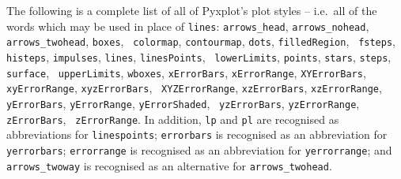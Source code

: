 The following is a complete list of all of Pyxplot's plot styles -- i.e.\ all
of the words which may be used in place of {\tt lines}: {\tt arrows\_\-head},
{\tt arrows\_\-no\-head}, {\tt arrows\_\-two\-head}, {\tt boxes}, {\tt
color\-map}, {\tt contour\-map}, {\tt dots}, {\tt filled\-Region}, {\tt
fsteps}, {\tt histeps}, {\tt impulses}, {\tt lines}, {\tt lines\-Points}, {\tt
lower\-Limits}, {\tt points}, {\tt stars}, {\tt steps}, {\tt surface}, {\tt
upper\-Limits}, {\tt wbox\-es}, {\tt x\-Error\-Bars}, {\tt x\-Error\-Range},
{\tt XY\-Error\-Bars}, {\tt xy\-Error\-Range}, {\tt xyz\-Error\-Bars}, {\tt
XYZ\-Error\-Range}, {\tt xz\-Error\-Bars}, {\tt xz\-Error\-Range}, {\tt
y\-Error\-Bars}, {\tt y\-Error\-Range}, {\tt y\-Error\-Shaded}, {\tt
yz\-Error\-Bars}, {\tt yz\-Error\-Range}, {\tt z\-Error\-Bars}, {\tt
z\-Error\-Range}. In addition, {\tt lp} and {\tt pl} are recognised as
abbreviations for {\tt lines\-points}; {\tt error\-bars} is recognised as an
abbreviation for {\tt y\-error\-bars}; {\tt error\-range} is recognised as an
abbreviation for {\tt y\-error\-range}; and {\tt arrows\_\-two\-way} is
recognised as an alternative for {\tt arrows\_\-two\-head}.

